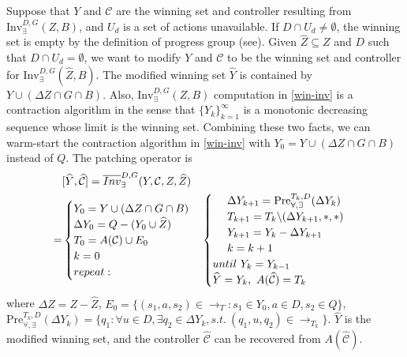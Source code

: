 Suppose that $ Y $ and $ \mathcal{C} $ are the winning set and controller resulting from $ \text{Inv}_{\exists}^{D,G}(Z,B) $, and $ U_d $ is a set of actions unavailable. If $ D\cap U_d \not= \emptyset$, the winning set is empty by the definition of progress group (see\cite{Nilsson2017}). Given $ \widehat{Z} \subseteq Z $ and $D$ such that $ D\cap U_d=\emptyset $, we want to modify $ Y $ and $ \mathcal{C} $ to be the winning set and controller for $ \text{Inv}_{\exists}^{D,G}(\widehat{Z}, B) $.  The modified winning set $\widehat{Y}$ is contained by $ Y\cup (\Delta Z\cap G\cap B) $. Also, $ \text{Inv}_{\exists}^{D,G}(Z,B) $ computation in \eqref{win-inv} is a contraction algorithm in the sense that $ \{Y_k\}_{k=1}^{\infty} $ is a monotonic decreasing sequence whose limit is the winning set. Combining these two facts, we can warm-start the contraction algorithm in \eqref{win-inv} with $ Y_0=Y\cup (\Delta Z\cap G\cap B)$ instead of $ Q $. The patching operator is
{\small\begin{align}
&[\widehat{Y},\widehat{\mathcal{C}}]=\overline{Inv}_{\exists}^{D,G}(Y,\mathcal{C},Z,\widehat{Z})\nonumber \\
=&\begin{cases}
Y_0 = Y\cup (\Delta Z\cap G \cap B)\\
\Delta Y_0 = Q - (Y_0 \cup \widehat{Z})\\
T_0  = A(\mathcal{C})\cup E_0\\
{\color{black} k=0}\\
{\color{black} repeat:}\\
\end{cases}
\begin{cases}
\ \ \ \ \Delta Y_{k+1} = \text{Pre}_{\forall,\exists}^{T_k,D}(\Delta Y_k) \\
\ \ \ \ T_{k+1} = T_{k}\backslash (\Delta Y_{k+1},*,*)\\
\ \ \ \ Y_{k+1} = Y_k- \Delta Y_{k+1}\\
\ \ \ \ {\color{black} k=k+1}\\
{\color{black} until \ Y_k = Y_{k-1}}\\
\widehat{Y}=Y_k,\ A(\widehat{\mathcal{C}}) = T_{k}
\end{cases}\label{patch-inv}
\end{align}}
where $ \Delta Z = Z - \widehat{Z} $, $ E_0 = \{(s_1,a,s_2)\in \rightarrow_{T}: s_1\in Y_0, a\in D, s_2 \in Q\} $, $ \text{Pre}_{\forall,\exists}^{T_k,D}(\Delta Y_k) = \{q_1: \forall u\in D, \exists q_2\in \Delta Y_k, s.t.\ (q_1, u, q_2) \in \rightarrow_{T_k} \} $. $ \widehat{Y} $ is the modified winning set, and the controller $ \widehat{\mathcal{C}} $ can be recovered from $ A(\widehat{\mathcal{C}}) $.

